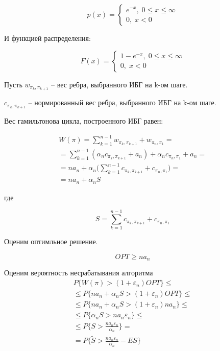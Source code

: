 \documentclass[a4paper, 14pt]{extarticle}
\numberwithin{equation}{section}
\begin{document}
\begin{equation*}
p(x) = \begin{cases}
 e^{-x}, \; 0 \leqslant x \leqslant \infty \\
0, \; x < 0
\end{cases}
\end{equation*}

И функцией распределения:

\begin{equation*}
F(x) = \begin{cases}
 1-e^{-x}, \; 0 \leqslant x \leqslant \infty \\
0, \; x < 0
\end{cases}
\end{equation*}

Пусть $w_{\pi_k, \pi_{k+1}}$ -- вес ребра, выбранного ИБГ на k-ом шаге.

$c_{\pi_k, \pi_{k+1}}$ -- нормированный вес ребра, выбранного ИБГ на k-ом шаге.

Вес гамильтонова цикла, построенного ИБГ равен:

\begin{equation*}
\begin{aligned}
W(\pi) = \sum_{k=1}^{n-1} w_{\pi_k, \pi_{k+1}} + w_{\pi_n, \pi_{1}} = \\
= \sum_{k=1}^{n-1} (\alpha_n c_{\pi_k, \pi_{k+1}} + a_n) +\alpha_n c_{\pi_n, \pi_{1}} + a_n = \\
= na_n + \alpha_n \Big( \sum_{k=1}^{n-1} c_{\pi_k, \pi_{k+1}} + c_{\pi_n, \pi_1} \Big) = \\
= na_n + \alpha_n S
\end{aligned}
\end{equation*}

где

\begin{equation*}
S = \sum_{k=1}^{n-1} c_{\pi_k, \pi_{k+1}} + c_{\pi_n, \pi_1}
\end{equation*}

Оценим оптимльное решение.

\begin{equation*}
OPT \geqslant na_n
\end{equation*}

Оценим вероятность несрабатывания алгоритма
\begin{equation*}
\begin{aligned}
P\{ W(\pi)>(1+\varepsilon_n)OPT \} \leqslant \\
\leqslant P\{na_n + \alpha_n S > (1+\varepsilon_n)OPT \} \leqslant \\ 
\leqslant P\{na_n + \alpha_n S > (1+\varepsilon_n)na_n \} \leqslant \\
\leqslant P\{\alpha_n S > na_n\varepsilon_n \} \leqslant \\
\leqslant P\{S >\frac{na_n\varepsilon_n}{\alpha_n}  \} = \\
= P\{\tilde{S} >\frac{na_n\varepsilon_n}{\alpha_n} - ES  \}
\end{aligned}
\end{equation*}
\end{document}
